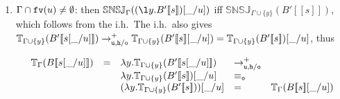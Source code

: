 \documentclass{LMCS}
\renewcommand{\>}{\rightarrow}
\def\lam{\lambda}
\def\Gam{\Gamma}
\newcommand{\Rew}[1]{\rightarrow_{#1}}
\newcommand{\multiset}[1]{ [ #1 ] }
\newcommand{\pair}[2]{\langle #1, #2 \rangle}
\newcommand{\Rewplus}[1]{\rightarrow^{+}_{#1}}
\newcommand{\fv}[1]{{\tt fv}(#1)}
\newcommand{\set}[1]{ \{ #1 \}}
\newcommand{\ems}{\emptyset}
\newcommand{\ih}{i.h.}
\newcommand{\unboxed}{{\tt u}}
\newcommand{\modulo}[2]{#1/#2}
\newcommand{\eqo}{\equiv_\osym}
\newcommand{\osym}{{\tt o}}
\newcommand{\aux}{{\tt void}}
\newcommand{\laux}{\lam\aux}
\newcommand{\New}{{\tt h}}
\newcommand{\snsudd}[2]{\mathbb{SNSJ}_{#1}(#2)}
\newcommand{\ctx}[2]{#1 [ \! [#2] \! ]}
\newcommand{\etamd}[2]{\mathbb{MSJ}_{#1}(#2)}
\newcommand{\surf}[2]{\mathbb{T}_{#1}(#2)}
\newcommand{\void}{\_}
\newcommand{\gm}{\sqsupset}
\begin{document}
\begin{enumerate}[$\bullet$]
\begin{enumerate}[$-$]
{\begin{enumerate}
\begin{enumerate}
   \[\begin{array}{llllllll}
   \surf{\Gam}{\lam y. \ctx{B'}{s[\void/u]}}
   &=&\lam y. \surf{\Gam\cup\set{y}}{\ctx{B'}{s[\void/u]}}&\Rew{\New}\\
   &&\lam y. \surf{\Gam\cup\set{y}}{\ctx{B'}{s}}&=&\\
   &&\surf{\Gam}{\lam y. \ctx{B'}{s}}&=&\surf{\Gam}{(\lam y. \ctx{B'}{s})[\void/u]}\\
   \end{array}\]
  \item If $\surf{\Gam\cup\set{y}}{\ctx{B'}{s[\void/u]}} =
  \surf{\Gam\cup\set{y}}{\ctx{B'}{s}[\void/u]}$ and
  $\etamd{\Gam\cup\set{y}}{\ctx{B'}{s[\void/u]}} \gm \etamd{\Gam\cup\set{y}}{\ctx{B'}{s}[\void/u]}=
  \etamd{\Gam\cup\set{y}}{\ctx{B'}{s}}\sqcup \multiset{\pair{\eta_{\laux}(u)}{|u|}}$
  then

   \[\begin{array}{llllllll}
   \surf{\Gam}{\lam y. \ctx{B'}{s[\void/u]}}&=& \lam y. \surf{\Gam\cup\set{y}}{\ctx{B'}{s[\void/u]}}&=\\
   &&\lam y. \surf{\Gam\cup\set{y}}{\ctx{B'}{s}[\void/u]}&=\\
   &&\lam y. \surf{\Gam\cup\set{y}}{\ctx{B'}{s}}&=\\
   &&\surf{\Gam}{\lam y.\ctx{B'}{s}}&=&\surf{\Gam}{(\lam y. \ctx{B'}{s})[\void/u]}
   \end{array}\]


  Then $\etamd{\Gam}{\l
  y.\ctx{B'}{s[\void/u]}}=\etamd{\Gam\cup\set{y}}{\ctx{B'}{s[\void/u]}} \gm
  \etamd{\Gam\cup\set{y}}{\ctx{B'}{s}[\void/u]} = \etamd{\Gam}{(\l
  y.\ctx{B'}{s})[\void/u]}$.
     \end{enumerate}

\item \emph{$\Gam\cap\fv{u}\neq\ems$}: then 
$\snsudd{\Gam}{(\l
  y. \ctx{B'}{s})[\void/u]}$ iff $\snsudd{\Gam\cup\set{y}}{\ctx{B'}{s}}$, 
which follows from the \ih\  The \ih\ also gives 
$\surf{\Gam\cup\set{y}}{\ctx{B'}{s[\void/u]}} 
\Rewplus{\modulo{\unboxed,\New}{\osym}}
\surf{\Gam\cup\set{y}}{\ctx{B'}{s}[\void/u]}=
\surf{\Gam\cup\set{y}}{\ctx{B'}{s}}[\void/u]$, thus 

\[\begin{array}{llllllll}
\surf{\Gam}{\ctx{B}{s[\void/u]}}&=&\lam y. \surf{\Gam\cup\set{y}}{\ctx{B'}{s[\void/u]}}& \Rewplus{\modulo{\unboxed,\New}{\osym}}\\
&&\lam y.\surf{\Gam\cup\set{y}}{\ctx{B'}{s}}[\void/u]& \eqo& \\
&&(\lam y.\surf{\Gam\cup\set{y}}{\ctx{B'}{s}})[\void/u]&=& \surf{\Gam}{\ctx{B}{s}[\void/u]}
\end{array}\]


\end{enumerate}}
\end{enumerate}
\end{enumerate}
\end{document}
